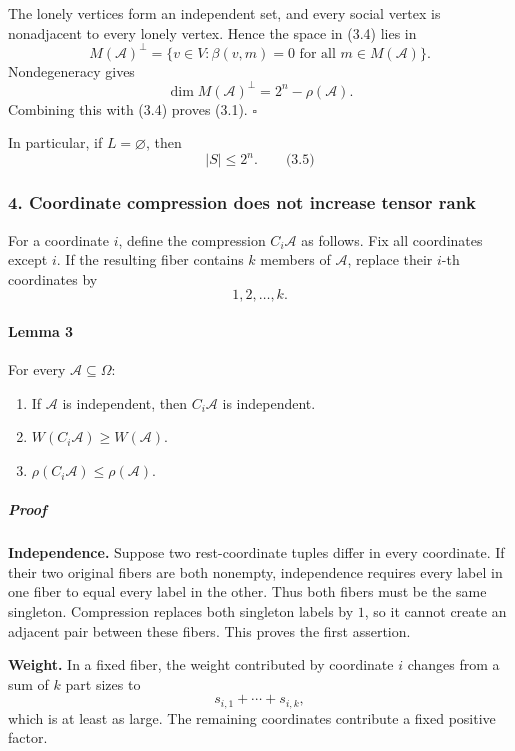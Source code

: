 \documentclass[
  11pt,
  a4paper,
]{article}
\newcounter{none} %
\providecommand{\tightlist}{%
  \setlength{\itemsep}{0pt}\setlength{\parskip}{0pt}}
\begin{document}
The lonely vertices form an independent set, and every social vertex is
nonadjacent to every lonely vertex. Hence the space in (3.4) lies in \[
M(\mathcal A)^\perp
=\{v\in V:\beta(v,m)=0\text{ for all }m\in M(\mathcal A)\}.
\] Nondegeneracy gives \[
\dim M(\mathcal A)^\perp=2^n-\rho(\mathcal A).
\] Combining this with (3.4) proves (3.1). \(\square\)

In particular, if \(L=\varnothing\), then \[
|S|\le 2^n.
\qquad\text{(3.5)}
\]

\subsubsection{4. Coordinate compression does not increase tensor
rank}\label{coordinate-compression-does-not-increase-tensor-rank}

For a coordinate \(i\), define the compression \(C_i\mathcal A\) as
follows. Fix all coordinates except \(i\). If the resulting fiber
contains \(k\) members of \(\mathcal A\), replace their \(i\)-th
coordinates by \[
1,2,\ldots,k.
\]

\paragraph{Lemma 3}\label{lemma-3}

For every \(\mathcal A\subseteq\Omega\):

\begin{enumerate}
\def\labelenumi{\arabic{enumi}.}
\tightlist
\item
  If \(\mathcal A\) is independent, then \(C_i\mathcal A\) is
  independent.
\item
  \(W(C_i\mathcal A)\ge W(\mathcal A)\).
\item
  \(\rho(C_i\mathcal A)\le\rho(\mathcal A)\).
\end{enumerate}

\subparagraph{Proof}\label{proof-2}

\textbf{Independence.} Suppose two rest-coordinate tuples differ in
every coordinate. If their two original fibers are both nonempty,
independence requires every label in one fiber to equal every label in
the other. Thus both fibers must be the same singleton. Compression
replaces both singleton labels by \(1\), so it cannot create an adjacent
pair between these fibers. This proves the first assertion.

\textbf{Weight.} In a fixed fiber, the weight contributed by coordinate
\(i\) changes from a sum of \(k\) part sizes to \[
s_{i,1}+\cdots+s_{i,k},
\] which is at least as large. The remaining coordinates contribute a
fixed positive factor.
\end{document}
